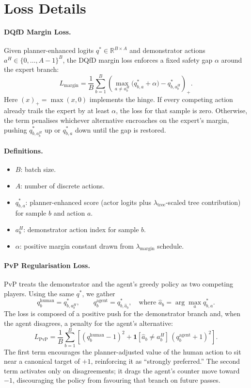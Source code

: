 \documentclass{article}
\begin{document}
\section{Loss Details}
\paragraph{DQfD Margin Loss.}
Given planner-enhanced logits $q^{\ast} \in \mathbb{R}^{B \times A}$ and demonstrator actions $a^{H} \in \{0,\dots,A-1\}^{B}$, the DQfD margin loss enforces a fixed safety gap $\alpha$ around the expert branch:
\[
L_{\mathrm{margin}} = \frac{1}{B} \sum_{b=1}^{B} \left(\max_{a \neq a^{H}_b} \big(q^{\ast}_{b,a} + \alpha\big) - q^{\ast}_{b,a^{H}_b}\right)_{+}.
\]
Here $(x)_{+} = \max(x, 0)$ implements the hinge. If every competing action already trails the expert by at least $\alpha$, the loss for that sample is zero. Otherwise, the term penalises whichever alternative encroaches on the expert’s margin, pushing $q^{\ast}_{b,a^{H}_b}$ up or $q^{\ast}_{b,a}$ down until the gap is restored.

\paragraph{Definitions.}
\begin{itemize}
  \item $B$: batch size.
  \item $A$: number of discrete actions.
  \item $q^{\ast}_{b,a}$: planner-enhanced score (actor logits plus $\lambda_{\mathrm{tree}}$-scaled tree contribution) for sample $b$ and action $a$.
  \item $a^{H}_b$: demonstrator action index for sample $b$.
  \item $\alpha$: positive margin constant drawn from $\lambda_{\mathrm{margin}}$ schedule.
\end{itemize}

\paragraph{PvP Regularisation Loss.}
PvP treats the demonstrator and the agent’s greedy policy as two competing players. Using the same $q^{\ast}$, we gather
\[
q^{\text{human}}_b = q^{\ast}_{b,a^{H}_b}, \qquad
q^{\text{agent}}_b = q^{\ast}_{b,\hat{a}_b}, \quad \text{where } \hat{a}_b = \arg\max_a q^{\ast}_{b,a}.
\]
The loss is composed of a positive push for the demonstrator branch and, when the agent disagrees, a penalty for the agent’s alternative:
\[
L_{\mathrm{PvP}} = \frac{1}{B} \sum_{b=1}^{B} \left[(q^{\text{human}}_b - 1)^2 + \mathbf{1}[\hat{a}_b \neq a^{H}_b] \, (q^{\text{agent}}_b + 1)^2 \right].
\]
The first term encourages the planner-adjusted value of the human action to sit near a canonical target of $+1$, reinforcing it as “strongly preferred.” The second term activates only on disagreements; it drags the agent’s counter move toward $-1$, discouraging the policy from favouring that branch on future passes.
\end{document}
